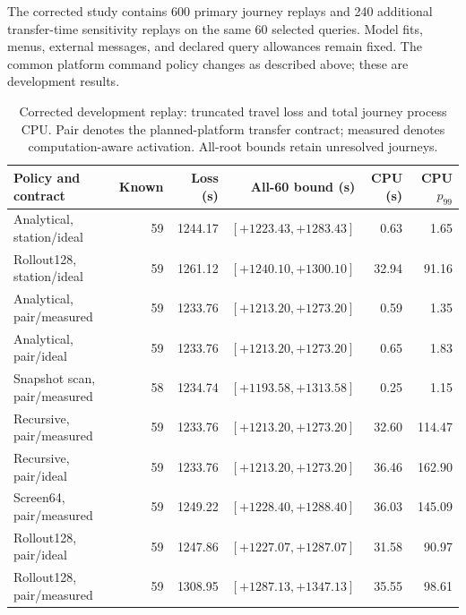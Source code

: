 The corrected study contains 600 primary journey replays and 240 additional transfer-time sensitivity replays on the same 60 selected queries. Model fits, menus, external messages, and declared query allowances remain fixed. The common platform command policy changes as described above; these are development results.

\begin{table}[ht]
\centering\small\setlength{\tabcolsep}{4pt}
\caption{Corrected development replay: truncated travel loss and total journey process CPU. Pair denotes the planned-platform transfer contract; measured denotes computation-aware activation. All-root bounds retain unresolved journeys.}
\begin{tabular}{p{}rrrrr}
\toprule
Policy and contract & Known & Loss (s) & All-60 bound (s) & CPU (s) & CPU $p_{99}$ \\
\midrule
Analytical, station/ideal & 59 & 1244.17 & $[+1223.43,+1283.43]$ & 0.63 & 1.65 \\
Rollout128, station/ideal & 59 & 1261.12 & $[+1240.10,+1300.10]$ & 32.94 & 91.16 \\
Analytical, pair/measured & 59 & 1233.76 & $[+1213.20,+1273.20]$ & 0.59 & 1.35 \\
Analytical, pair/ideal & 59 & 1233.76 & $[+1213.20,+1273.20]$ & 0.65 & 1.83 \\
Snapshot scan, pair/measured & 58 & 1234.74 & $[+1193.58,+1313.58]$ & 0.25 & 1.15 \\
Recursive, pair/measured & 59 & 1233.76 & $[+1213.20,+1273.20]$ & 32.60 & 114.47 \\
Recursive, pair/ideal & 59 & 1233.76 & $[+1213.20,+1273.20]$ & 36.46 & 162.90 \\
Screen64, pair/measured & 59 & 1249.22 & $[+1228.40,+1288.40]$ & 36.03 & 145.09 \\
Rollout128, pair/ideal & 59 & 1247.86 & $[+1227.07,+1287.07]$ & 31.58 & 90.97 \\
Rollout128, pair/measured & 59 & 1308.95 & $[+1287.13,+1347.13]$ & 35.55 & 98.61 \\
\bottomrule
\end{tabular}
\end{table}

